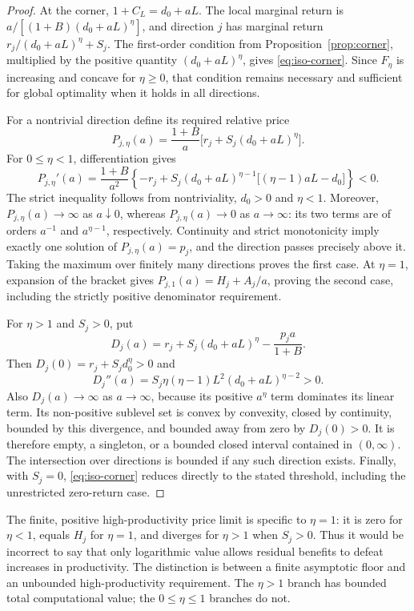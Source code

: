\documentclass[11pt,a4paper]{article}
\theoremstyle{definition}\newtheorem{definition}{Definition}
\begin{document}
\begin{proof}
At the corner, $1+C_L=d_0+aL$. The local marginal return is
$a/[(1+B)(d_0+aL)^\eta]$, and direction $j$ has marginal return
$r_j/(d_0+aL)^\eta+S_j$. The first-order condition from
Proposition~\ref{prop:corner}, multiplied by the positive quantity
$(d_0+aL)^\eta$, gives \eqref{eq:iso-corner}. Since $F_\eta$ is
increasing and concave for $\eta\geq0$, that condition remains necessary
and sufficient for global optimality when it holds in all directions.

For a nontrivial direction define its required relative price
\[
 P_{j,\eta}(a)=\frac{1+B}{a}\big[r_j+S_j(d_0+aL)^\eta\big].
\]
For $0\leq\eta<1$, differentiation gives
\[
 P_{j,\eta}'(a)=\frac{1+B}{a^2}
 \left\{-r_j+S_j(d_0+aL)^{\eta-1}
 \big[(\eta-1)aL-d_0\big]\right\}<0.
\]
The strict inequality follows from nontriviality, $d_0>0$ and
$\eta<1$. Moreover, $P_{j,\eta}(a)\to\infty$ as $a\downarrow0$,
whereas $P_{j,\eta}(a)\to0$ as $a\to\infty$: its two terms are of
orders $a^{-1}$ and $a^{\eta-1}$, respectively. Continuity and strict
monotonicity imply exactly one solution of $P_{j,\eta}(a)=p_j$,
and the direction passes precisely above it. Taking the maximum over
finitely many directions proves the first case. At $\eta=1$, expansion
of the bracket gives $P_{j,1}(a)=H_j+A_j/a$, proving the second case,
including the strictly positive denominator requirement.

For $\eta>1$ and $S_j>0$, put
\[
 D_j(a)=r_j+S_j(d_0+aL)^\eta-\frac{p_j a}{1+B}.
\]
Then $D_j(0)=r_j+S_jd_0^\eta>0$ and
\[
 D_j''(a)=S_j\eta(\eta-1)L^2(d_0+aL)^{\eta-2}>0.
\]
Also $D_j(a)\to\infty$ as $a\to\infty$, because its positive
$a^\eta$ term dominates its linear term. Its non-positive sublevel set
is convex by convexity, closed by continuity, bounded by this divergence,
and bounded away from zero by $D_j(0)>0$. It is therefore empty, a
singleton, or a bounded closed interval contained in $(0,\infty)$.
The intersection over directions is bounded if any such direction exists.
Finally, with $S_j=0$, \eqref{eq:iso-corner} reduces directly to the
stated threshold, including the unrestricted zero-return case.
\end{proof}
The finite, positive high-productivity price limit is specific to
$\eta=1$: it is zero for $\eta<1$, equals $H_j$ for $\eta=1$, and
diverges for $\eta>1$ when $S_j>0$. Thus it would be incorrect to say
that only logarithmic value allows residual benefits to defeat increases
in productivity. The distinction is between a finite asymptotic floor and
an unbounded high-productivity requirement. The $\eta>1$ branch has
bounded total computational value; the $0\leq\eta\leq1$ branches do not.
\end{document}
